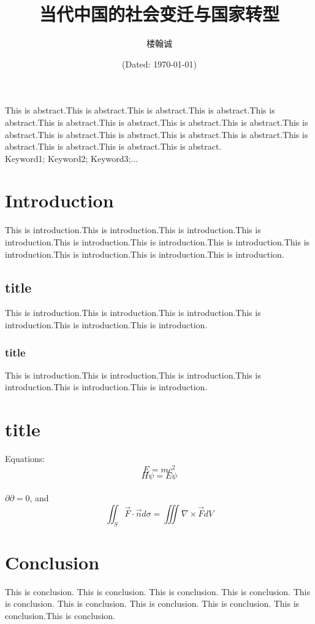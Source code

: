 \documentclass[hyperref]{ctexart}
\title{\textbf{当代中国的社会变迁与国家转型}}
\author{\sffamily 楼翰诚}
\date{(Dated: \today)}
\begin{document}
	\maketitle
		This is abstract.This is abstract.This is abstract.This is abstract.This is abstract.This is abstract.This is abstract.This is abstract.This is abstract.This is abstract.This is abstract.This is abstract.This is abstract.This is abstract.This is abstract.This is abstract.This is abstract.This is abstract.\\
		
		Keyword1; Keyword2; Keyword3;...
	\begin{multicols}{2}
	\section{Introduction}
	This is introduction.This is introduction.This is introduction.This is introduction.This is introduction.This is introduction.This is introduction.This is introduction.This is introduction.This is introduction.This is introduction.
	\subsection{title}
	This is introduction.This is introduction.This is introduction.This is introduction.This is introduction.This is introduction.
	\subsubsection{title}
	This is introduction.This is introduction.This is introduction.This is introduction.This is introduction.This is introduction.
	\section{title}
	\noindent Equations: 
	\begin{equation}
		E=mc^2
	\end{equation}
	\begin{equation}
		H\psi=E\psi
	\end{equation}\\
	$\partial\partial=0$, and
	$$\iint_S \vec{F}\cdot \vec{n}d\sigma=\iiint \nabla\times\vec{F}dV$$
	\section{Conclusion}
	This is conclusion. This is conclusion. This is conclusion. This is conclusion. This is conclusion. This is conclusion. This is conclusion. This is conclusion. This is conclusion.This is conclusion.

\end{multicols}
\end{document}

